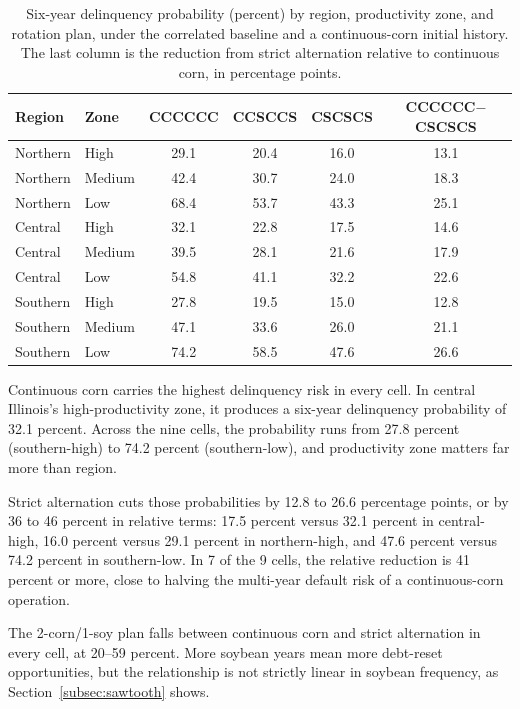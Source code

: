 \documentclass[11pt,letterpaper]{article}
\theoremstyle{remark}
\begin{document}
\begin{table}[htbp]
\centering
\caption{Six-year delinquency probability (percent) by region, productivity zone, and rotation plan, under the correlated baseline and a continuous-corn initial history. The last column is the reduction from strict alternation relative to continuous corn, in percentage points.}
\label{tab:delinq_cells}
\begin{tabular}{llcccc}
\hline
Region & Zone & CCCCCC & CCSCCS & CSCSCS & CCCCCC$-$CSCSCS \\
\hline
Northern & High   & 29.1 & 20.4 & 16.0 & 13.1 \\
Northern & Medium & 42.4 & 30.7 & 24.0 & 18.3 \\
Northern & Low    & 68.4 & 53.7 & 43.3 & 25.1 \\
Central  & High   & 32.1 & 22.8 & 17.5 & 14.6 \\
Central  & Medium & 39.5 & 28.1 & 21.6 & 17.9 \\
Central  & Low    & 54.8 & 41.1 & 32.2 & 22.6 \\
Southern & High   & 27.8 & 19.5 & 15.0 & 12.8 \\
Southern & Medium & 47.1 & 33.6 & 26.0 & 21.1 \\
Southern & Low    & 74.2 & 58.5 & 47.6 & 26.6 \\
\hline
\end{tabular}
\end{table}

Continuous corn carries the highest delinquency risk in every cell. In central Illinois's high-productivity zone, it produces a six-year delinquency probability of 32.1 percent. Across the nine cells, the probability runs from 27.8 percent (southern-high) to 74.2 percent (southern-low), and productivity zone matters far more than region.
 
Strict alternation cuts those probabilities by 12.8 to 26.6 percentage points, or by 36 to 46 percent in relative terms: 17.5 percent versus 32.1 percent in central-high, 16.0 percent versus 29.1 percent in northern-high, and 47.6 percent versus 74.2 percent in southern-low. In 7 of the 9 cells, the relative reduction is 41 percent or more, close to halving the multi-year default risk of a continuous-corn operation.
 
The 2-corn/1-soy plan falls between continuous corn and strict alternation in every cell, at 20--59 percent. More soybean years mean more debt-reset opportunities, but the relationship is not strictly linear in soybean frequency, as Section~\ref{subsec:sawtooth} shows.
 
\end{document}
